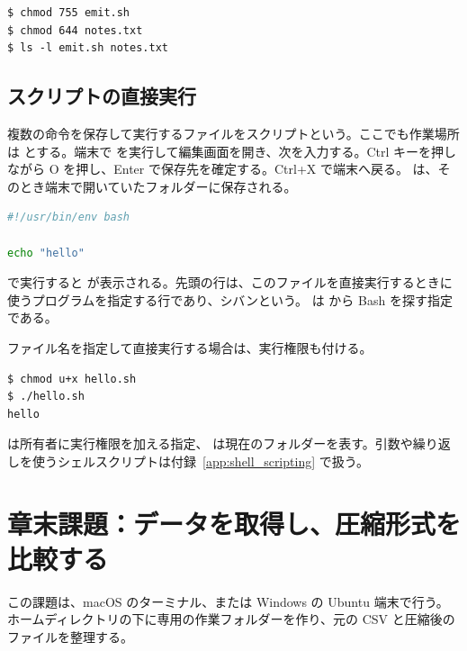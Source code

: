 \begin{lstlisting}[numbers=none, xleftmargin=2\zw]
$ chmod 755 emit.sh
$ chmod 644 notes.txt
$ ls -l emit.sh notes.txt
\end{lstlisting}

\subsection{スクリプトの直接実行}

複数の命令を保存して実行するファイルをスクリプトという。ここでも作業場所は  とする。端末で  を実行して編集画面を開き、次を入力する。Ctrl キーを押しながら O を押し、Enter で保存先を確定する。Ctrl+X で端末へ戻る。 は、そのとき端末で開いていたフォルダーに保存される。

\begin{lstlisting}[language=bash]
#!/usr/bin/env bash

echo "hello"
\end{lstlisting}

 で実行すると  が表示される。先頭の行は、このファイルを直接実行するときに使うプログラムを指定する行であり、シバンという。 は  から Bash を探す指定である。

ファイル名を指定して直接実行する場合は、実行権限も付ける。

\begin{lstlisting}[numbers=none, xleftmargin=2\zw]
$ chmod u+x hello.sh
$ ./hello.sh
hello
\end{lstlisting}

 は所有者に実行権限を加える指定、 は現在のフォルダーを表す。引数や繰り返しを使うシェルスクリプトは付録~\ref{app:shell_scripting} で扱う。

\section{章末課題：データを取得し、圧縮形式を比較する}
\label{sec:shell-exercises}

この課題は、macOS のターミナル、または Windows の Ubuntu 端末で行う。ホームディレクトリの下に専用の作業フォルダーを作り、元の CSV と圧縮後のファイルを整理する。

